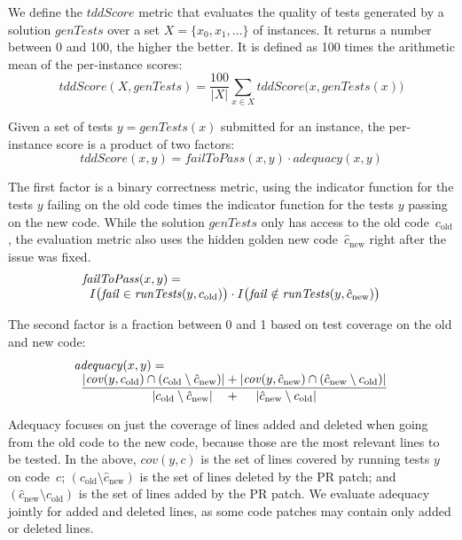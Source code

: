 We define the $\mathit{tddScore}$ metric that evaluates the quality of tests
generated by a solution $\mathit{genTests}$ over a set
\mbox{$X=\{x_0,x_1,\ldots\}$} of instances.  It returns a number between 0 and
100, the higher the better.  It is defined as 100 times the arithmetic mean of
the per-instance scores:
{\small
\[\mathit{tddScore}(X, \mathit{genTests})
  = \frac{100}{|X|}\sum_{x\in X} \mathit{tddScore}\big(x, \mathit{genTests}(x)\big)
\]}

Given a set of tests $y=\mathit{genTests}(x)$ submitted for an
instance, the per-instance score is a product of two factors:
\[\mathit{tddScore}(x, y)
  = \mathit{failToPass}(x, y) \cdot \mathit{adequacy}(x, y)
\]

The first factor is a binary correctness metric, using the indicator function
for the tests $y$ failing on the old code times the indicator function for the
tests $y$ passing on the new code.  While the solution $\mathit{genTests}$ only
has access to the old \mbox{code $c_\mathrm{old}$}, the evaluation metric also
uses the hidden golden new \mbox{code $\hat{c}_\mathrm{new}$} right after the
issue was fixed.
{\small
\[\begin{array}{@{}l@{}}\mathit{failToPass}(x, y) =\\
  \;\;I\big(\mathit{fail} \in \mathit{runTests}(y, c_\mathrm{old})\big)
  \cdot I\big(\mathit{fail} \notin \mathit{runTests}(y, \hat{c}_\mathrm{new})\big)
\end{array}\]}

The second factor is a fraction between 0 and 1 based on test coverage on
the old and new code:
{\small
\[\begin{array}{@{}l@{}}\mathit{adequacy}(x, y) =\\
  \displaystyle\;\;
    \frac{  |\mathit{cov}(y, c_\mathrm{old}) \cap (c_\mathrm{old}\setminus\hat{c}_\mathrm{new})|
          + |\mathit{cov}(y, \hat{c}_\mathrm{new}) \cap (\hat{c}_\mathrm{new}\setminus c_\mathrm{old})|}
         {  |c_\mathrm{old}\setminus\hat{c}_\mathrm{new}| \quad
          + \quad\; |\hat{c}_\mathrm{new}\setminus c_\mathrm{old}|}
\end{array}\]}

Adequacy focuses on just the coverage of lines added and deleted when going from
the old code to the new code, because those are the most relevant lines to be
tested.  In the above, $\mathit{cov}(y,c)$ is the set of lines covered by
running tests $y$ on code~$c$; $(c_\mathrm{old}\setminus\hat{c}_\mathrm{new})$
is the set of lines deleted by the PR patch; and $(\hat{c}_\mathrm{new}\setminus
c_\mathrm{old})$ is the set of lines added by the PR patch. 
We evaluate adequacy jointly for added and deleted lines, as some code patches may contain only added or deleted
lines.

